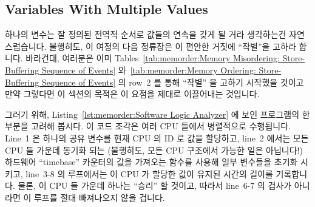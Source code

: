 \subsection{Variables With Multiple Values}
\label{sec:memorder:Variables With Multiple Values}

하나의 변수는 잘 정의된 전역적 순서로 값들의 연속을 갖게 될 거라 생각하는건
자연스럽습니다.
불행히도, 이 여정의 다음 정류장은 이 편안한 거짓에 ``작별''을 고하라 합니다.
바라건대, 여러분은 이미
Tables~\ref{tab:memorder:Memory Misordering: Store-Buffering Sequence of Events}
와~\ref{tab:memorder:Memory Ordering: Store-Buffering Sequence of Events} 의
row~2 를 통해 ``작별'' 을 고하기 시작했을 것이고 만약 그렇다면 이 섹션의 목적은
이 요점을 제대로 이끌어내는 것입니다.

그러기 위해,
Listing~\ref{lst:memorder:Software Logic Analyzer} 에 보인 프로그램의 한 부분을
고려해 봅시다.
이 코드 조각은 여러 CPU 들에서 병렬적으로 수행됩니다.
Line~1 은 하나의 공유 변수를 현재 CPU 의 ID 로 값을 할당하고, line~2 에서는
모든 CPU 들 가운데 동기화 되는 (불행히도, 모든 CPU 구조에서 가능한 일은
아닙니다!) 하드웨어 ``timebase'' 카운터의 값을 가져오는  함수를
사용해 일부 변수들을 초기화 시키고, line~3-8 의 루프에서는 이 CPU 가 할당한
값이 유지된 시간의 길이를 기록합니다.
물론, 이 CPU 들 가운데 하나는 ``승리'' 할 것이고, 따라서 line~6-7 의 검사가
아니라면 이 루프를 절대 빠져나오지 않을 겁니다.

